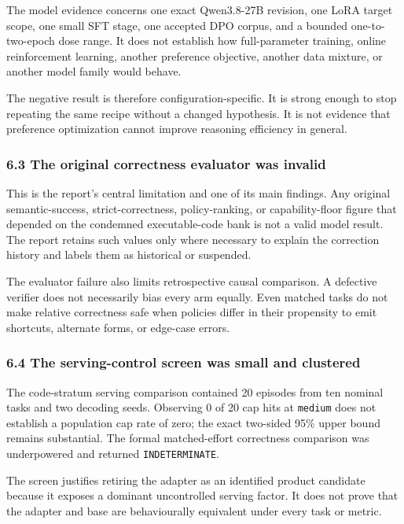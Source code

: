 \documentclass[
]{article}
\begin{document}
The model evidence concerns one exact Qwen3.8-27B revision, one LoRA
target scope, one small SFT stage, one accepted DPO corpus, and a
bounded one-to-two-epoch dose range. It does not establish how
full-parameter training, online reinforcement learning, another
preference objective, another data mixture, or another model family
would behave.

The negative result is therefore configuration-specific. It is strong
enough to stop repeating the same recipe without a changed hypothesis.
It is not evidence that preference optimization cannot improve reasoning
efficiency in general.

\subsubsection{6.3 The original correctness evaluator was
invalid}\label{63-the-original-correctness-evaluator-was-invalid}

This is the report's central limitation and one of its main findings.
Any original semantic-success, strict-correctness, policy-ranking, or
capability-floor figure that depended on the condemned executable-code
bank is not a valid model result. The report retains such values only
where necessary to explain the correction history and labels them as
historical or suspended.

The evaluator failure also limits retrospective causal comparison. A
defective verifier does not necessarily bias every arm equally. Even
matched tasks do not make relative correctness safe when policies differ
in their propensity to emit shortcuts, alternate forms, or edge-case
errors.

\subsubsection{6.4 The serving-control screen was small and
clustered}\label{64-the-serving-control-screen-was-small-and-clustered}

The code-stratum serving comparison contained 20 episodes from ten
nominal tasks and two decoding seeds. Observing 0 of 20 cap hits at
\texttt{medium} does not establish a population cap rate of zero; the
exact two-sided 95\% upper bound remains substantial. The formal
matched-effort correctness comparison was underpowered and returned
\texttt{INDETERMINATE}.

The screen justifies retiring the adapter as an identified product
candidate because it exposes a dominant uncontrolled serving factor. It
does not prove that the adapter and base are behaviourally equivalent
under every task or metric.
\end{document}
